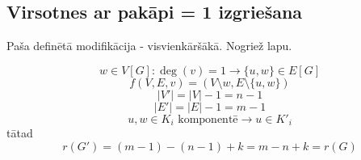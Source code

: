 \documentclass[12pt, a4paper]{article}
\begin{document}
\newpage
\subsection{Virsotnes ar pakāpi = 1 izgriešana}
Paša definētā modifikācija - visvienkāršākā. Nogriež lapu.

\begin{equation}
    w \in V[G] : \deg(v) = 1 \rightarrow \lbrace u,w \rbrace \in E[G]
\end{equation}
\begin{equation}
    f(V,E,v) = (V \setminus w, E \setminus \lbrace u,w \rbrace)
\end{equation}
\begin{equation}
    \vert V' \vert = \vert V \vert - 1 = n - 1
\end{equation}
\begin{equation}
    \vert E' \vert = \vert E \vert - 1 = m - 1
\end{equation}
\begin{equation}
    u,w \in K_i \text{ komponentē} \rightarrow u \in K'_i
\end{equation}
tātad
\begin{equation}
    r(G') = (m-1)-(n-1)+k = m-n+k = r(G)
\end{equation}
\end{document}
